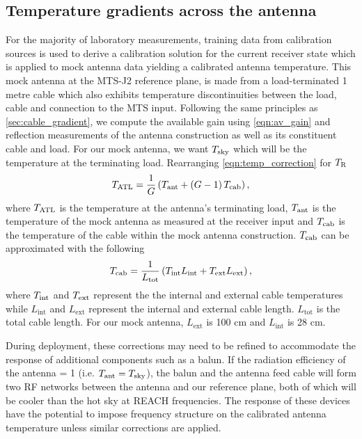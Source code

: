 \subsection{Temperature gradients across the antenna}\label{sec:ant_corrections}
For the majority of laboratory measurements, training data from calibration sources is used to derive a calibration solution for the current receiver state which is applied to mock antenna data yielding a calibrated antenna temperature. This mock antenna at the MTS-J2 reference plane, is made from a load-terminated 1 metre cable which also exhibits temperature discontinuities between the load, cable and connection to the MTS input. Following the same principles as \cref{sec:cable_gradient}, we compute the available gain using \cref{eqn:av_gain} and reflection measurements of the antenna construction as well as its constituent cable and load. For our mock antenna, we want $T_{\mathrm{sky}}$ which will be the temperature at the terminating load. Rearranging \cref{eqn:temp_correction} for $T_{\mathrm{R}}$
\begin{equation}
    T_{\mathrm{ATL}} = \frac{1}{G} \left( T_{\mathrm{ant}} + \left( G - 1 \right) T_{\mathrm{cab}} \right),
\end{equation}
where $T_{\mathrm{ATL}}$ is the temperature at the antenna’s terminating load, $T_{\mathrm{ant}}$ is the temperature of the mock antenna as measured at the receiver input and $T_{\mathrm{cab}}$ is the temperature of the cable within the mock antenna construction. $T_{\mathrm{cab}}$ can be approximated with the following
\begin{equation}
    T_{\mathrm{cab}} = \frac{1}{L_{\mathrm{tot}}} \left( T_{\mathrm{int}}L_{\mathrm{int}} + T_{\mathrm{ext}}L_{\mathrm{ext}} \right),
\end{equation}
where $T_{\mathrm{int}}$ and $T_{\mathrm{ext}}$ represent the the internal and external cable temperatures while $L_{\mathrm{int}}$ and $L_{\mathrm{ext}}$ represent the internal and external cable length. $L_{\mathrm{tot}}$ is the total cable length. For our mock antenna, $L_{\mathrm{ext}}$ is 100 cm and $L_{\mathrm{int}}$ is 28 cm.

During deployment, these corrections may need to be refined to accommodate the response of additional components such as a balun. If the radiation efficiency of the antenna = 1 (i.e. $T_{\mathrm{ant}}=T_{\mathrm{sky}}$), the balun and the antenna feed cable will form two RF networks between the antenna and our reference plane, both of which will be cooler than the hot sky at REACH frequencies. The response of these devices have the potential to impose frequency structure on the calibrated antenna temperature unless similar corrections are applied.

